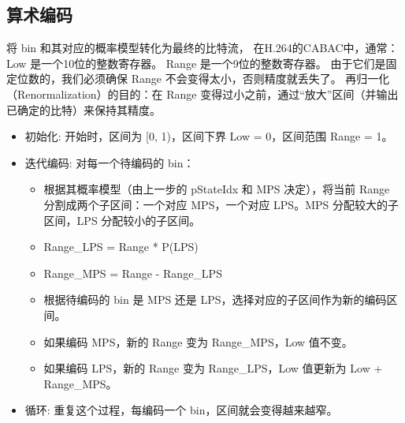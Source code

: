 \documentclass{/Users/hi/Study/template/code}
\begin{document}
\subsection{算术编码}
将 bin 和其对应的概率模型转化为最终的比特流，
在H.264的CABAC中，通常：
Low 是一个10位的整数寄存器。
Range 是一个9位的整数寄存器。
由于它们是固定位数的，我们必须确保 Range 不会变得太小，否则精度就丢失了。
再归一化（Renormalization）的目的：在 Range 变得过小之前，通过“放大”区间（并输出已确定的比特）来保持其精度。
\begin{itemize}
	\item 初始化: 开始时，区间为 [0, 1)，区间下界 Low = 0，区间范围 Range = 1。
	\item 迭代编码: 对每一个待编码的 bin：
	      \begin{itemize}
		      \item 根据其概率模型（由上一步的 pStateIdx 和 MPS 决定），将当前 Range 分割成两个子区间：一个对应 MPS，一个对应 LPS。MPS 分配较大的子区间，LPS 分配较小的子区间。
		      \item Range\_LPS = Range * P(LPS)
		      \item Range\_MPS = Range - Range\_LPS
		      \item 根据待编码的 bin 是 MPS 还是 LPS，选择对应的子区间作为新的编码区间。
		      \item 如果编码 MPS，新的 Range 变为 Range\_MPS，Low 值不变。
		      \item 如果编码 LPS，新的 Range 变为 Range\_LPS，Low 值更新为 Low + Range\_MPS。
	      \end{itemize}
	\item 循环: 重复这个过程，每编码一个 bin，区间就会变得越来越窄。
\end{itemize}
\end{document}
